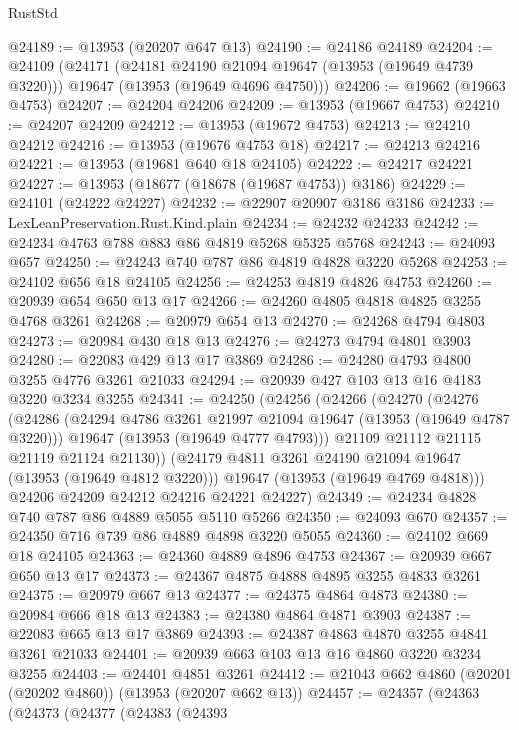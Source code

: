 \begin{lexlean}{RustStd}
\begin{coremodule}
@24189 := @13953 (@20207 @647 @13)
@24190 := @24186 @24189
@24204 := @24109
    (@24171
      (@24181 @24190 @21094 @19647 (@13953 (@19649 @4739 @3220)))
      @19647
      (@13953 (@19649 @4696 @4750)))
@24206 := @19662 (@19663 @4753)
@24207 := @24204 @24206
@24209 := @13953 (@19667 @4753)
@24210 := @24207 @24209
@24212 := @13953 (@19672 @4753)
@24213 := @24210 @24212
@24216 := @13953 (@19676 @4753 @18)
@24217 := @24213 @24216
@24221 := @13953 (@19681 @640 @18 @24105)
@24222 := @24217 @24221
@24227 := @13953 (@18677 (@18678 (@19687 @4753)) @3186)
@24229 := @24101 (@24222 @24227)
@24232 := @22907 @20907 @3186 @3186
@24233 := LexLeanPreservation.Rust.Kind.plain
@24234 := @24232 @24233
@24242 := @24234 @4763 @788 @883 @86 @4819 @5268 @5325 @5768
@24243 := @24093 @657
@24250 := @24243 @740 @787 @86 @4819 @4828 @3220 @5268
@24253 := @24102 @656 @18 @24105
@24256 := @24253 @4819 @4826 @4753
@24260 := @20939 @654 @650 @13 @17
@24266 := @24260 @4805 @4818 @4825 @3255 @4768 @3261
@24268 := @20979 @654 @13
@24270 := @24268 @4794 @4803
@24273 := @20984 @430 @18 @13
@24276 := @24273 @4794 @4801 @3903
@24280 := @22083 @429 @13 @17 @3869
@24286 := @24280 @4793 @4800 @3255 @4776 @3261 @21033
@24294 := @20939 @427 @103 @13 @16 @4183 @3220 @3234 @3255
@24341 := @24250
    (@24256
      (@24266
        (@24270
          (@24276
            (@24286
              (@24294 @4786 @3261 @21997 @21094 @19647 (@13953 (@19649 @4787 @3220)))
              @19647
              (@13953 (@19649 @4777 @4793)))
            @21109
            @21112
            @21115
            @21119
            @21124
            @21130))
        (@24179 @4811 @3261 @24190 @21094 @19647 (@13953 (@19649 @4812 @3220)))
        @19647
        (@13953 (@19649 @4769 @4818)))
      @24206
      @24209
      @24212
      @24216
      @24221
      @24227)
@24349 := @24234 @4828 @740 @787 @86 @4889 @5055 @5110 @5266
@24350 := @24093 @670
@24357 := @24350 @716 @739 @86 @4889 @4898 @3220 @5055
@24360 := @24102 @669 @18 @24105
@24363 := @24360 @4889 @4896 @4753
@24367 := @20939 @667 @650 @13 @17
@24373 := @24367 @4875 @4888 @4895 @3255 @4833 @3261
@24375 := @20979 @667 @13
@24377 := @24375 @4864 @4873
@24380 := @20984 @666 @18 @13
@24383 := @24380 @4864 @4871 @3903
@24387 := @22083 @665 @13 @17 @3869
@24393 := @24387 @4863 @4870 @3255 @4841 @3261 @21033
@24401 := @20939 @663 @103 @13 @16 @4860 @3220 @3234 @3255
@24403 := @24401 @4851 @3261
@24412 := @21043 @662 @4860 (@20201 (@20202 @4860)) (@13953 (@20207 @662 @13))
@24457 := @24357
    (@24363
      (@24373
        (@24377
          (@24383
            (@24393

\end{coremodule}
\end{lexlean}
